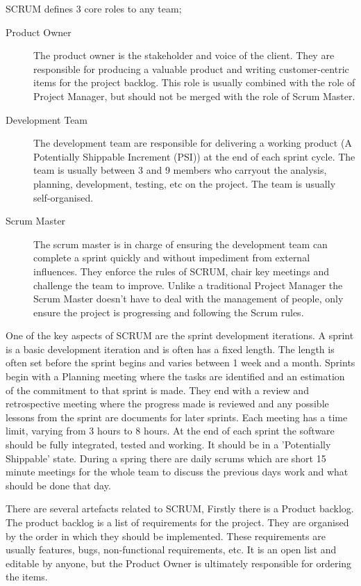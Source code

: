 \documentclass[11pt,a4paper]{article}
\begin{document}
SCRUM defines 3 core roles to any team;

\begin{description}
\item[Product Owner] The product owner is the stakeholder and voice of the client. They are responsible for producing a valuable product and writing customer-centric items for the project backlog. This role is usually combined with the role of Project Manager, but should not be merged with the role of Scrum Master. 
\item[Development Team] The development team are responsible for delivering a working product (A Potentially Shippable Increment (PSI)) at the end of each sprint cycle. The team is usually between 3 and 9 members who carryout the analysis, planning, development, testing, etc on the project. The team is usually self-organised.
\item[Scrum Master] The scrum master is in charge of ensuring the development team can complete a sprint quickly and without impediment from external influences. They enforce the rules of SCRUM, chair key meetings and challenge the team to improve. Unlike a traditional Project Manager the Scrum Master doesn't have to deal with the management of people, only ensure the project is progressing and following the Scrum rules. 
\end{description}

One of the key aspects of SCRUM are the sprint development iterations. A sprint is a basic development iteration and is often has a fixed length. The length is often set before the sprint begins and varies between 1 week and a month. Sprints begin with a Planning meeting where the tasks are identified and an estimation of the commitment to that sprint is made. They end with a  review and retrospective meeting where the progress made is reviewed and any possible lessons from the sprint are documents for later sprints. Each meeting has a time limit, varying from 3 hours to 8 hours. At the end of each sprint the software should be fully integrated, tested and working. It should be in a 'Potentially Shippable' state. During a spring there are daily scrums which are short 15 minute meetings for the whole team to discuss the previous days work and what should be done that day. 

There are several artefacts related to SCRUM, Firstly there is a Product backlog. The product backlog is a list of requirements for the project. They are organised by the order in which they should be implemented. These requirements are usually features, bugs, non-functional requirements, etc. It is an open list and editable by anyone, but the Product Owner is ultimately responsible for ordering the items. 
\end{document}
